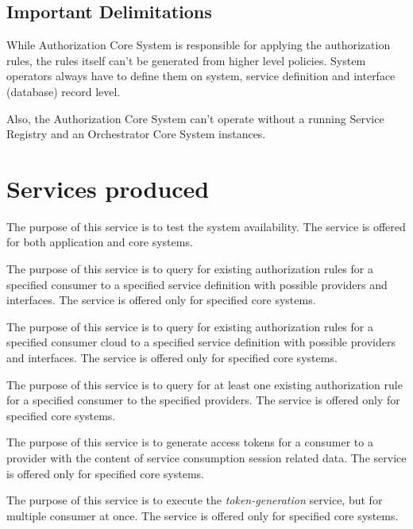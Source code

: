 \documentclass[a4paper]{arrowhead}
\begin{document}
\subsection{Important Delimitations}
\label{sec:delimitations}

While Authorization Core System is responsible for applying the authorization rules, the rules itself can't be generated from higher level policies. System operators always have to define them on system, service definition and interface (database) record level. 

Also, the Authorization Core System can't operate without a running Service Registry and an Orchestrator Core System instances.

\newpage

\section{Services produced}
\label{sec:services}

The purpose of this service is to test the system availability. The service is offered for both application and core systems. 

The purpose of this service is to query for existing authorization rules for a specified consumer to a specified service definition with possible providers and interfaces. The service is offered only for specified core systems.

The purpose of this service is to query for existing authorization rules for a specified consumer cloud to a specified service definition with possible providers and interfaces. The service is offered only for specified core systems.

The purpose of this service is to query for at least one existing authorization rule for a specified consumer to the specified providers. The service is offered only for specified core systems.

The purpose of this service is to generate access tokens for a consumer to a provider with the content of service consumption session related data. The service is offered only for specified core systems.

The purpose of this service is to execute the \textit{token-generation} service, but for multiple consumer at once. The service is offered only for specified core systems.
\end{document}

